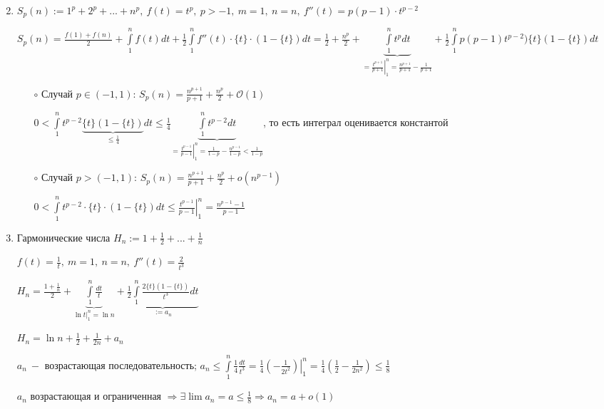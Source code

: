 \begin{example}
    \begin{enumerate}
        \item[]
        \item $S_p(n):=1^p+2^p+...+n^p,\ f(t)=t^p,\ p>-1,\ m=1,\ n=n,\ f''(t)=p(p-1)\cdot t^{p-2}$
        
        $S_p(n)=\frac{f(1)+f(n)}{2}+\int\limits_1^nf(t)dt+\frac{1}{2}\int\limits_1^nf''(t)\cdot \{t\}\cdot (1-\{t\})dt
        =\frac{1}{2}+\frac{n^p}{2}+\underbrace{\int\limits_1^nt^pdt}_{=\left.\frac{t^{p+1}}{p+1}\right|_1^n=\frac{n^{p+1}}{p+1}-\frac{1}{p+1}}+\frac{1}{2}\int\limits_1^np(p-1)t^{p-2})\{t\}(1-\{t\})dt$

        \begin{enumerate}
            \item[$\circ$] Случай $p\in (-1,1)$: $S_p(n)=\frac{n^{p+1}}{p+1}+\frac{n^p}{2}+\mathcal{O}(1)$

            $0<\int\limits_1^nt^{p-2}\underbrace{\{t\}(1-\{t\})}_{\leq \frac{1}{4}}dt\leq \frac{1}{4}\underbrace{\int\limits_1^nt^{p-2}dt}_{=\left.\frac{t^{p-1}}{p-1}\right|_1^n=\frac{1}{1-p}-\frac{n^{p-1}}{1-p}<\frac{1}{1-p}}$, то есть интеграл оценивается константой
            \item[$\circ$] Случай $p > (-1,1)$: $S_p(n)=\frac{n^{p+1}}{p+1}+\frac{n^p}{2}+o(n^{p-1})$

            $0<\int\limits_1^nt^{p-2}\cdot \{t\}\cdot (1-\{t\})dt\leq \left.\frac{t^{p-1}}{p-1}\right|_1^n=\frac{n^{p-1}-1}{p-1}$
        \end{enumerate}
        
        \item Гармонические числа $H_n:=1+\frac{1}{2}+...+\frac{1}{n}$

        $f(t)=\frac{1}{t},\ m=1,\ n=n,\ f''(t)=\frac{2}{t^3}$

        $H_n=\frac{1+\frac{1}{n}}{2}+\underbrace{\int\limits_1^n\frac{dt}{t}}_{\left.\ln t\right|_1^n=\ln n}+\underbrace{\frac{1}{2}\int\limits_1^n\frac{2\{t\}(1-\{t\})}{t^3}dt}_{:=a_n}$

        $H_n=\ln n + \frac{1}{2}+\frac{1}{2n}+a_n$

        $a_n\ -$ возрастающая последовательность; $a_n\leq \int\limits_1^n\frac{1}{4}\frac{dt}{t^3}=\left.\frac{1}{4}(-\frac{1}{2t^2})\right|_1^n=\frac{1}{4}(\frac{1}{2}-\frac{1}{2n^2})\leq \frac{1}{8}$

        $a_n$ возрастающая и ограниченная $\Rightarrow \exists \lim a_n=a\leq \frac{1}{8}\Rightarrow a_n=a+o(1)$


\end{enumerate}
\end{example}

